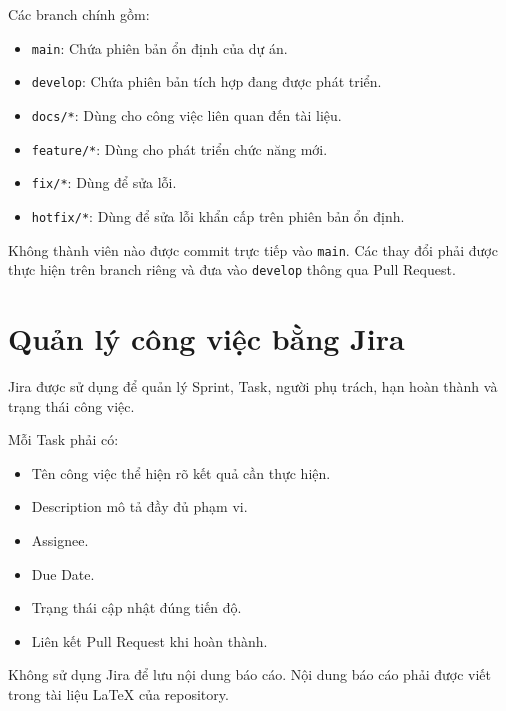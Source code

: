 Các branch chính gồm:

\begin{itemize}
	\item \texttt{main}: Chứa phiên bản ổn định của dự án.
	
	\item \texttt{develop}: Chứa phiên bản tích hợp đang được phát triển.
	
	\item \texttt{docs/*}: Dùng cho công việc liên quan đến tài liệu.
	
	\item \texttt{feature/*}: Dùng cho phát triển chức năng mới.
	
	\item \texttt{fix/*}: Dùng để sửa lỗi.
	
	\item \texttt{hotfix/*}: Dùng để sửa lỗi khẩn cấp trên phiên bản ổn định.
\end{itemize}

Không thành viên nào được commit trực tiếp vào \texttt{main}. Các thay
đổi phải được thực hiện trên branch riêng và đưa vào \texttt{develop}
thông qua Pull Request.

\section{Quản lý công việc bằng Jira}

Jira được sử dụng để quản lý Sprint, Task, người phụ trách, hạn hoàn
thành và trạng thái công việc.

Mỗi Task phải có:

\begin{itemize}
	\item Tên công việc thể hiện rõ kết quả cần thực hiện.
	\item Description mô tả đầy đủ phạm vi.
	\item Assignee.
	\item Due Date.
	\item Trạng thái cập nhật đúng tiến độ.
	\item Liên kết Pull Request khi hoàn thành.
\end{itemize}

Không sử dụng Jira để lưu nội dung báo cáo. Nội dung báo cáo phải được
viết trong tài liệu LaTeX của repository.

